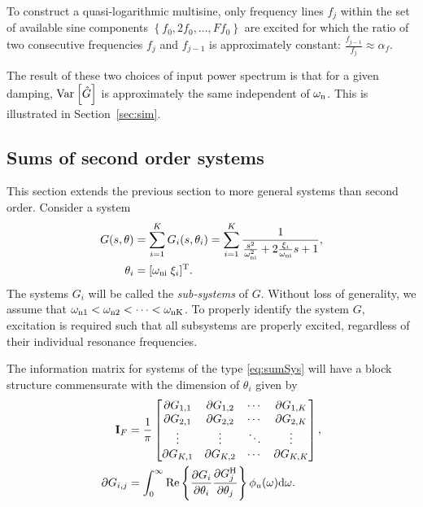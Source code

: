 To construct a quasi-logarithmic multisine, only frequency lines $f_j$ within the set of available sine components $\left\{f_0, 2 f_0, \ldots, F f_0  \right\}$ are excited for which the ratio of two consecutive frequencies $f_j$ and $f_{j-1}$ is approximately constant: $\frac{f_{j-1}}{f_j} \approx \alpha_f$.

The result of these two choices of input power spectrum is that for a given damping, $\var{\hat{G}}$ is approximately the same independent of $\wn$. 
This is illustrated in Section~\ref{sec:sim}.

\subsection{Sums of second order systems}
This section extends the previous section to more general systems than second order.
Consider a system
\begin{align}
G(s,\theta) &= \sum_{i=1}^{K} G_i(s,\theta_i)
             =\sum_{i=1}^{K}  \frac{1}
                                   {   \frac{s^2}{\wn[i]^2}
                                    + 2\frac{\damping_i}{\wn[i]}s
                                    + 1},\\
\theta_i&=[\wn[i]\;\damping_i]^{\T}.
\label{eq:sumSys}
\end{align}
The systems  $G_i$ will be called the \emph{sub-systems} of $G$. 
Without loss of generality, we assume that $\wn[1] < \wn[2] < \cdots < \wn[K]$. 
To properly identify the system $G$, excitation is required such that all subsystems are properly excited, regardless of their individual resonance frequencies.

The information matrix for systems of the type \eqref{eq:sumSys} will have a block structure commensurate with the dimension of $\theta_i$ given by
\begin{align}
\IF &= \frac{1}{\pi}
\begin{bmatrix}
  \partial G_{1,1}        &\partial G_{1,2}       &\cdots         &\partial G_{1,K}\\
  \partial G_{2,1}        &\partial G_{2,2}       &\cdots         &\partial G_{2,K}\\
  \vdots                  &\vdots                 &\ddots         &\vdots          \\
  \partial G_{K,1}        &\partial G_{K,2}       &\cdots         &\partial G_{K,K}
\end{bmatrix},\\
\partial G_{i,j} &= \int_0^\infty
                      \mathrm{Re}\left\{
                          \frac{\partial G_i}
                               {\partial \theta_i}
                          \frac{\partial G_j^{\HT}}
                               {\partial \theta_j}
                                \right\}
                      \phi_u(\omega)\dd\omega.
\end{align}

